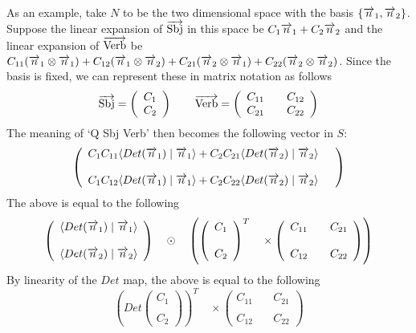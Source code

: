 As an example, take $N$ to be the two dimensional space with the basis $\{\overrightarrow{n}_1, \overrightarrow{n}_2\}$. Suppose the linear expansion of $\overrightarrow{\text{Sbj}}$ in this space be $C_1 \overrightarrow{n}_1 + C_2 \overrightarrow{n}_2$ and the linear expansion of $\overrightarrow{\text{Verb}}$ be $C_{11} (\overrightarrow{n}_1 \otimes \overrightarrow{n}_1) + C_{12} (\overrightarrow{n}_1 \otimes \overrightarrow{n}_2) +  C_{21} ( \overrightarrow{n}_2 \otimes \overrightarrow{n}_1) + C_{22} (\overrightarrow{n}_2 \otimes \overrightarrow{n}_2)$.  Since the  basis is fixed, we can represent these in matrix notation as follows
\[
\overrightarrow{\text{Sbj}} = \left ( \begin{array}{c} C_1\\ C_2\end{array}\right)\qquad
\overrightarrow{\text{Verb}} = \left (\begin{array}{cc} C_{11} \quad & C_{12}\\ C_{21} \quad & C_{22} \end{array}\right)
\]
The meaning of `Q Sbj Verb' then becomes the following vector in $S$:
\[
\left( \begin{array}{cc}
C_1C_{11} \langle Det(\overrightarrow{n}_1) \mid \overrightarrow{n}_1 \rangle + C_2 C_{21} \langle Det(\overrightarrow{n}_2) \mid \overrightarrow{n}_2 \rangle\\
&\\
C_1 C_{12} \langle Det(\overrightarrow{n}_1) \mid \overrightarrow{n}_1 \rangle + C_2 C_{22} \langle Det(\overrightarrow{n}_2) \mid \overrightarrow{n}_2 \rangle
\end{array} \right)
\]
The above is equal to the following
\[
\left (\begin{array}{c}
\langle Det(\overrightarrow{n}_1) \mid \overrightarrow{n}_1 \rangle \\
\ \\
\langle Det(\overrightarrow{n}_2) \mid \overrightarrow{n}_2 \rangle
\end{array}\right)
\quad 
\odot
\quad 
\left(
\left(\begin{array}{c}
C_1 \\ 
\ \\
 C_2
\end{array}\right)^T \quad \times 
\left( \begin{array}{cc}
C_{11}   \quad &  C_{21} \\
&\\
 C_{12}  \quad & C_{22} 
\end{array} \right)\right)
\]
By linearity of the $Det$ map, the above is equal to the following
\[
\left(Det\left(\begin{array}{c}
C_1 \\ 
\ \\
 C_2
\end{array}\right)\right)^T \quad \times 
\left( \begin{array}{cc}
C_{11}   \quad &  C_{21} \\
&\\
 C_{12}  \quad & C_{22} 
\end{array} \right)
\]
